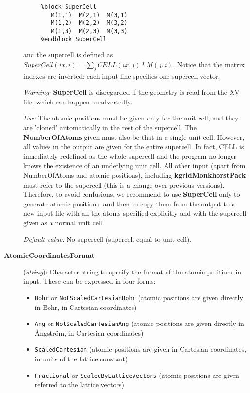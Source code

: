 \begin{description}
\begin{verbatim}
     %block SuperCell
        M(1,1)  M(2,1)  M(3,1) 
        M(1,2)  M(2,2)  M(3,2) 
        M(1,3)  M(2,3)  M(3,3) 
     %endblock SuperCell
\end{verbatim}

and the supercell is defined as
$SuperCell(ix,i) = \sum_j CELL(ix,j)*M(j,i)$.
Notice that the matrix indexes are inverted: each input line 
specifies one supercell vector.

\textit{Warning:} \textbf{SuperCell} is disregarded if the geometry is read from
the XV file, which can happen unadvertedly.

\textit{Use:} The atomic positions must be given only for the unit cell,
and they are 'cloned' automatically in the rest of the supercell.
The \textbf{NumberOfAtoms} given must also be that in a single unit cell.
However, all values in the output are given for the entire supercell. 
In fact, CELL is inmediately redefined as the whole supercell and the 
program no longer knows the existence of an underlying unit cell.
All other input (apart from NumberOfAtoms and atomic positions), 
including \textbf{kgridMonkhorstPack} must refer to the supercell 
(this is a change over previous versions). Therefore, to avoid
confusions, we recommend to use \textbf{SuperCell} only to
generate atomic positions, and then to copy them from the output
to a new input file with all the atoms specified explicitly and
with the supercell given as a normal unit cell.

\textit{Default value:} No supercell (supercell equal to unit cell).


\item[\textbf{AtomicCoordinatesFormat}] (\textit{string}):
Character string to specify the format of the atomic positions in
input. These can be expressed in four forms:
\begin{itemize}
\item \texttt{Bohr} or \texttt{NotScaledCartesianBohr} (atomic positions
are given directly in Bohr, in Cartesian coordinates)
\item \texttt{Ang} or \texttt{NotScaledCartesianAng} (atomic positions
are given directly in {\AA}ngstr\"om, in Cartesian coordinates)
\item \texttt{ScaledCartesian} (atomic positions are given
in Cartesian coordinates, in units of the lattice constant)
\item \texttt{Fractional} or \texttt{ScaledByLatticeVectors} (atomic positions
are given referred to the lattice vectors)
\end{itemize}


\end{description}
